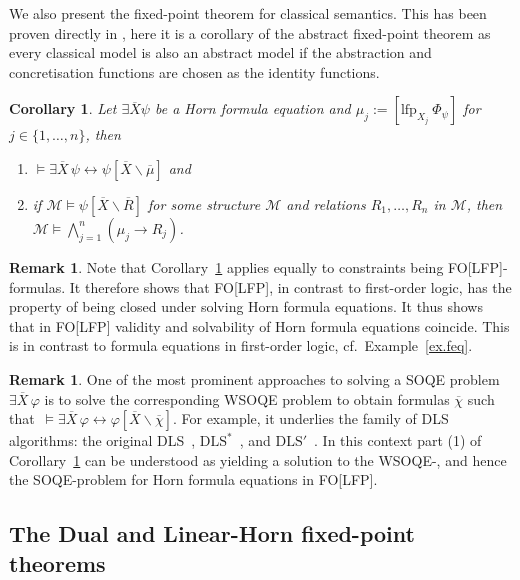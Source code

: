 \documentclass[acmsmall]{acmart}
\theoremstyle{plain}
\newtheorem{corollary}[theorem]{Corollary}
\theoremstyle{definition}
\newtheorem{remark}[theorem]{Remark}
\newcommand{\calM}{\mathcal{M}}
\newcommand{\mybar}[1]{\overline{#1}}
\newcommand{\sop}{[} %
\newcommand{\scl}{]} %
\newcommand{\sel}[2]{#1 \backslash #2} %
\newcommand{\unsubst}[2]{\sop \sel{#1}{#2} \scl} %
\newcommand{\impl}{\rightarrow} %
\newcommand{\liff}{\leftrightarrow} %
\newcommand{\Land}{\bigwedge}
\newcommand{\lfp}{\mathrm{lfp}} %
\begin{document}
We also present the fixed-point theorem for classical semantics. This has been proven directly in \cite{Kloibhofer20Fixed}, here it is a corollary of the abstract fixed-point theorem as every classical model is also an abstract model if the abstraction and concretisation functions are chosen as the identity functions.
\begin{corollary}\label{cor.HornFP}
	Let $\exists \mybar{X} \psi$ be a Horn formula equation and $\mu_j := [\lfp_{X_j} ~\Phi_{\psi}]$
	for $j \in \{1,\ldots,n\}$, then
	\begin{enumerate}
		\item $\models \exists \mybar{X}\,\psi \liff \psi\unsubst{\mybar{X}}{\mybar{\mu}}$ and
		\item if  $\calM \models \psi \unsubst{\mybar{X}}{\mybar{R}}$
		for some structure $\calM$ and relations $R_1,\ldots,R_n$ in $\calM$, then
		$\calM \models \Land_{j=1}^n ( \mu_j \impl R_j )$.
	\end{enumerate}
\end{corollary}

\begin{remark}
Note that Corollary~\ref{cor.HornFP} applies equally to constraints being FO[LFP]-formulas.
It therefore shows that FO[LFP], in contrast to first-order logic, has the property of being
 closed under solving Horn formula equations.
It thus shows that in FO[LFP] validity and solvability of Horn formula equations coincide.
This is in contrast to formula equations in first-order logic, cf.~Example~\ref{ex.feq}.
\end{remark}

\begin{remark}
One of the most prominent approaches to solving a SOQE problem $\exists \mybar{X}\, \varphi$ is to
 solve the corresponding WSOQE problem to obtain formulas $\mybar{\chi}$
 such that\ $\models \exists \mybar{X}\, \varphi \liff \varphi\unsubst{\mybar{X}}{\mybar{\chi}}$.
For example, it underlies the family of DLS algorithms: the original DLS~\cite{Doherty97Computing},
 $\text{DLS}^*$~\cite{Doherty98General,Nonnengart98Fixpoint}, and $\text{DLS}'$~\cite{Eberhard17Boolean}.
In this context part (1) of Corollary~\ref{cor.HornFP} can be understood as yielding a solution
 to the WSOQE-, and hence the SOQE-problem for Horn formula equations in FO[LFP].
\end{remark}

\subsection{The Dual and Linear-Horn fixed-point theorems}\label{sec.dualLinearfpthm}
\end{document}
